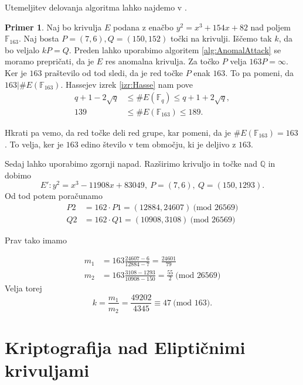 \documentclass[12pt,a4paper,twoside]{article}
\theoremstyle{definition} %
\newtheorem{primer}[definicija]{Primer}
\theoremstyle{plain} %
\numberwithin{equation}{section}  %
\newcommand{\Q}{\mathbb Q}
\newcommand{\F}{\mathbb F}
\newcommand{\E}[1]{E({#1})}
\newcommand{\MOD}[1]{\ \text{(mod }{#1}\text{)}}
\begin{document}
Utemeljitev delovanja algoritma lahko najdemo v \cite{Washington2008}.

\begin{primer}
Naj bo krivulja $E$ podana z enačbo $y^2=x^3+154x+82$ nad poljem $\F_{163}$. Naj bosta $P = (7,6),Q = (150,152)$ točki na krivulji. Iščemo tak $k$, da bo veljalo $kP=Q$. Preden lahko uporabimo algoritem \ref{alg:AnomalAttack} se moramo prepričati, da je $E$ res anomalna krivulja. Za točko $P$ velja $163P = \infty$. Ker je $163$ praštevilo od tod sledi, da je red točke $P$ enak $163$. To pa pomeni, da $163|\#\E{\F_{163}}$. Hassejev izrek \ref{izr:Hasse} nam pove 
\begin{align}
q+1-2\sqrt{q} &{}\leq \#\E{\F_q} \leq q+1+2\sqrt{q}, \nonumber \\
139 &{}\leq \#\E{\F_{163}} \leq 189. \nonumber
\end{align}

Hkrati pa vemo, da red točke deli red grupe, kar pomeni, da je $\#\E{\F_{163}} = 163$. To velja, ker je $163$ edino število v tem območju, ki je deljivo z $163$.

Sedaj lahko uporabimo zgornji napad. Razširimo krivuljo in točke nad $\Q$ in dobimo
$$E': y^2 = x^3-11908x+83049, \ P =(7,6), \ Q=(150,1293).$$
Od tod potem poračunamo
\begin{align}
P2 &{}= 162\cdot P1 = (12884,24607) \MOD{26569} \nonumber \\
Q2 &{}= 162\cdot Q1 = (10908,3108) \MOD{26569} \nonumber
\end{align}

Prav tako imamo

\begin{align}
m_1 &{}= 163\frac{24607-6}{12884-7} = \frac{24601}{79} \nonumber \\
m_2 &{}= 163\frac{3108-1293}{10908-150} = \frac{55}{2} \MOD{26569} \nonumber
\end{align}
 Velja torej
$$k = \frac{m_1}{m_2} = \frac{49202}{4345} \equiv 47 \MOD{163}.$$
\end{primer}



\newpage

\section{Kriptografija nad Eliptičnimi krivuljami}
\end{document}
